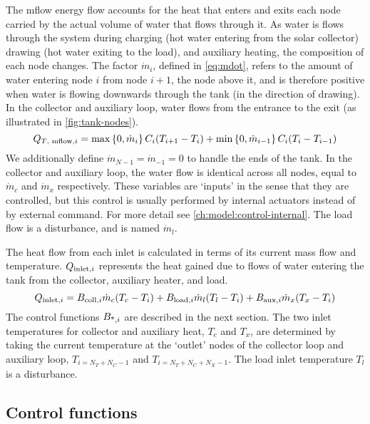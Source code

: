 The mflow energy flow accounts for the heat that enters and exits each node carried by the actual volume of water that flows through it.
As water is flows through the system during charging (hot water entering from the solar collector) drawing (hot water exiting to the load), and auxiliary heating, the composition of each node changes.
The factor $\dot{m}_i$, defined in \autoref{eq:mdot}, refers to the amount of water entering node $i$ from node $i+1$, the node above it, and is therefore positive when water is flowing downwards through the tank (in the direction of drawing).
In the collector and auxiliary loop, water flows from the entrance to the exit (as illustrated in \autoref{fig:tank-nodes}).
\begin{equation}
   \label{eq:tank-Q-mflow}
   Q_{\text{$T$, mflow}, i} = \max \left\{ 0, \dot{m}_i \right\}     C_i (T_{i+1} - T_i)
             + \min \left\{ 0, \dot{m}_{i-1} \right\} C_i (T_i - T_{i-1})
\end{equation}
We additionally define $\dot{m}_{N-1} = \dot{m}_{-1} = 0$ to handle the ends of the tank.
In the collector and auxiliary loop, the water flow is identical across all nodes, equal to $\dot{m}_c$ and $\dot{m}_x$ respectively.
These variables are `inputs' in the sense that they are controlled, but this control is usually performed by internal actuators instead of by external command.
For more detail see \autoref{ch:model:control-internal}.
The load flow is a disturbance, and is named $\dot{m}_l$.

The heat flow from each inlet is calculated in terms of its current mass flow and temperature.
$Q_{\text{inlet}, i}$ represents the heat gained due to flows of water entering the tank from the collector, auxiliary heater, and load.
\begin{equation}
   \label{eq:Q-inlet}
   Q_{\text{inlet}, i} = B_{\text{coll}, i} \dot{m}_c (T_c - T_i)
             + B_{\text{load}, i} \dot{m}_l (T_l - T_i)
             + B_{\text{aux}, i} \dot{m}_x (T_x - T_i)
\end{equation}
The control functions $B_{\text{*}, i}$ are described in the next section.
The two inlet temperatures for collector and auxiliary heat, $T_c$ and $T_x$, are determined by taking the current temperature at the `outlet' nodes of the collector loop and auxiliary loop, $T_{i=N_T+N_C-1}$ and $T_{i=N_T+N_C+N_X-1}$.
The load inlet temperature $T_l$ is a disturbance.

\subsection{Control functions}


